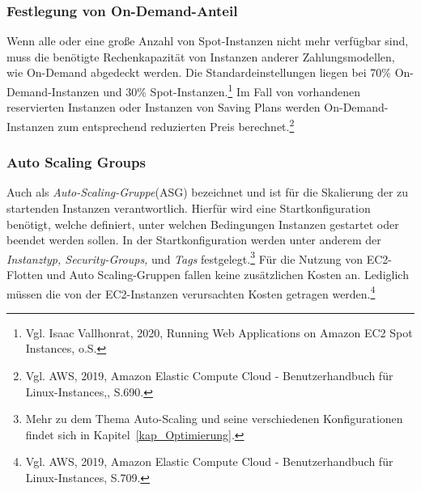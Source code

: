 \subsubsection*{Festlegung von On-Demand-Anteil}
Wenn alle oder eine große Anzahl von Spot-Instanzen nicht mehr verfügbar sind, muss die benötigte Rechenkapazität von Instanzen anderer Zahlungsmodellen, wie On-Demand abgedeckt werden. Die Standardeinstellungen liegen bei 70\% On-Demand-Instanzen und 30\% Spot-Instanzen.\footnote{Vgl. Isaac Vallhonrat, 2020, Running Web Applications on Amazon EC2 Spot Instances, o.S.\cite{AMZ24}} Im Fall von vorhandenen reservierten Instanzen oder Instanzen von Saving Plans werden On-Demand-Instanzen zum entsprechend reduzierten Preis berechnet.\footnote{Vgl. AWS, 2019, Amazon Elastic Compute Cloud - Benutzerhandbuch für Linux-Instances,, S.690\cite{AMZ26}.}

\subsubsection*{Auto Scaling Groups}%
Auch als \textit{Auto-Scaling-Gruppe}(ASG) bezeichnet und ist für die Skalierung der zu startenden Instanzen verantwortlich. Hierfür wird eine Startkonfiguration benötigt, welche definiert, unter welchen Bedingungen Instanzen gestartet oder beendet werden sollen. In der Startkonfiguration werden unter anderem der \textit{Instanztyp, Security-Groups,} und \textit{Tags} festgelegt.\footnote{Mehr zu dem Thema Auto-Scaling und seine verschiedenen Konfigurationen findet sich in Kapitel~\ref{kap_Optimierung}.} Für die Nutzung von EC2-Flotten und Auto Scaling-Gruppen fallen keine zusätzlichen Kosten an. Lediglich müssen die von der EC2-Instanzen verursachten Kosten getragen werden.\footnote{Vgl. AWS, 2019, Amazon Elastic Compute Cloud - Benutzerhandbuch für Linux-Instances, S.709\cite{AMZ26}. }

